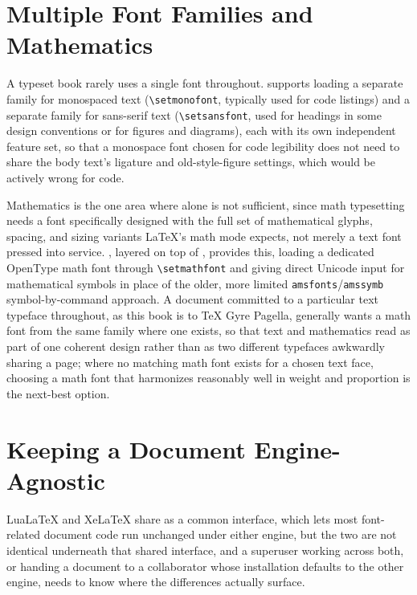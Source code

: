\hypertarget{multiple-font-families-and-mathematics}{%
\section{Multiple Font Families and Mathematics}\label{multiple-font-families-and-mathematics}}

A typeset book rarely uses a single font throughout.  supports loading a separate family for monospaced text (\texttt{\textbackslash{}setmonofont}, typically used for code listings) and a separate family for sans-serif text (\texttt{\textbackslash{}setsansfont}, used for headings in some design conventions or for figures and diagrams), each with its own independent feature set, so that a monospace font chosen for code legibility does not need to share the body text's ligature and old-style-figure settings, which would be actively wrong for code.

Mathematics is the one area where  alone is not sufficient, since math typesetting needs a font specifically designed with the full set of mathematical glyphs, spacing, and sizing variants LaTeX's math mode expects, not merely a text font pressed into service. , layered on top of , provides this, loading a dedicated OpenType math font through \texttt{\textbackslash{}setmathfont} and giving direct Unicode input for mathematical symbols in place of the older, more limited \texttt{amsfonts}/\texttt{amssymb} symbol-by-command approach. A document committed to a particular text typeface throughout, as this book is to TeX Gyre Pagella, generally wants a math font from the same family where one exists, so that text and mathematics read as part of one coherent design rather than as two different typefaces awkwardly sharing a page; where no matching math font exists for a chosen text face, choosing a math font that harmonizes reasonably well in weight and proportion is the next-best option.

\hypertarget{keeping-a-document-engine-agnostic}{%
\section{Keeping a Document Engine-Agnostic}\label{keeping-a-document-engine-agnostic}}

LuaLaTeX and XeLaTeX share  as a common interface, which lets most font-related document code run unchanged under either engine, but the two are not identical underneath that shared interface, and a superuser working across both, or handing a document to a collaborator whose installation defaults to the other engine, needs to know where the differences actually surface.

